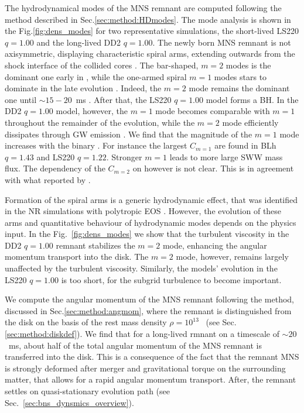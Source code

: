 The hydrodynamical modes of the \ac{MNS} remnant are computed following the 
method described in Sec.\ref{sec:method:HDmodes}. 
The mode analysis is shown in the Fig.\ref{fig:dens_modes} for two representative 
simulations, the short-lived LS220 $q=1.00$ and the long-lived DD2 $q=1.00$.
The newly born \ac{MNS} remnant is not axisymmetric, displaying characteristic 
spiral arms, extending outwards from the shock interface of the collided cores 
\citep{Shibata:1999wm,Shibata:2006nm,Bernuzzi:2013rza,Kastaun:2014fna,East:2015vix,Paschalidis:2015mla,Radice:2016gym,Lehner:2016wjg}.
The bar-shaped, $m=2$ modes is the dominant one early in \pmerg{}, while the 
one-armed spiral $m=1$ modes stars to dominate in the late evolution 
\citep{East:2015vix,Paschalidis:2015mla,Radice:2016gym,Lehner:2016wjg,Bernuzzi:2013rza,Kastaun:2014fna}.
Indeed, the $m=2$ mode remains the dominant one until $\sim15-20$~ms \pmerg{}. 
After that, the LS220 $q=1.00$ model forms a \ac{BH}. 
In the DD2 $q=1.00$ model, however, the $m=1$ mode becomes comparable with $m=1$ 
throughout the remainder of the evolution, while the $m=2$ mode efficiently dissipates 
through \ac{GW} emission \citep{Bernuzzi:2015opx,Radice:2016gym}.
We find that the magnitude of the $m=1$ mode increases with the binary \mr{}.
For instance the largest $C_{m=1}$ are found in BLh $q=1.43$ and LS220 $q=1.22$.
Stronger $m=1$ leads to more large \ac{SWW} mass flux.
The dependency of the $C_{m=2}$ on \mr{} however is not clear. 
This is in agreement with what reported by \citet{Lehner:2016wjg}.

Formation of the spiral arms is a generic hydrodynamic effect, that was identified 
in the \ac{NR} simulations with polytropic \ac{EOS} 
\citep{Bernuzzi:2013rza,Radice:2016gym}.
However, the evolution of these arms and quantitative behaviour of hydrodynamic
modes depends on the physics input. 
In the Fig.~\ref{fig:dens_modes} we show that the turbulent viscosity in the 
DD2 $q=1.00$ remnant stabilizes the $m=2$ mode, enhancing the angular momentum 
transport into the disk.
The $m=2$ mode, however, remains largely unaffected by the turbulent viscosity.
Similarly, the models' evolution in the LS220 $q=1.00$ is too short, for the 
subgrid turbulence to become important.

We compute the angular momentum of the \ac{MNS} remnant following the method,
discussed in Sec.\ref{sec:method:angmom}, where the remnant is distinguished 
from the disk on the basis of the rest mass density $\rho=10^{13}$~\gcm{} 
(see Sec.\ref{sec:method:diskdef}).
We find that for a long-lived rmnant 
on a timescale of $\sim20$~ms, about half of the total angular momentum 
of the \ac{MNS} remnant is transferred into the disk. 
This is a consequence of the fact that the remnant \ac{MNS} is strongly deformed 
after merger and gravitational torque on the surrounding matter, 
that allows for a rapid angular momentum transport.
After, the remnant settles on quasi-stationary evolution path 
(see Sec.~\ref{sec:bns_dynsmics_overview}).

